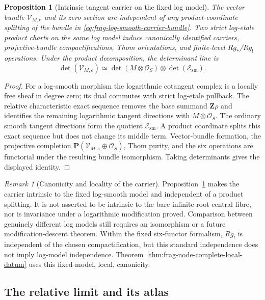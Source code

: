 \documentclass[11pt]{article}
\newtheorem{proposition}[theorem]{Proposition}
\theoremstyle{definition}
\theoremstyle{remark}
\newtheorem{remark}[theorem]{Remark}
\begin{document}
\begin{proposition}[Intrinsic tangent carrier on the fixed log model]
\label{prop:frag-intrinsic-tangent-carrier}
The vector bundle $\mathcal V_{M,e}$ and its zero section are independent of
any product-coordinate splitting of the bundle in
\eqref{eq:frag-log-smooth-carrier-bundle}.  Two strict log-etale product charts
on the same log model induce canonically identified carriers, projective-bundle
compactifications, Thom orientations, and finite-level $Rg_*$/$Rg_!$
operations.  Under the product decomposition, the determinant line is
\[
 \det(\mathcal V_{M,e})
 \simeq \det(M\otimes\mathcal O_S)\otimes\det(\mathcal E_{\mathrm{sm}}).
\]
\end{proposition}

\begin{proof}
For a log-smooth morphism the logarithmic cotangent complex is a locally free
sheaf in degree zero; its dual commutes with strict log-etale pullback.  The
relative characteristic exact sequence removes the base summand
$\mathbf Z\rho$ and identifies the remaining logarithmic tangent directions
with $M\otimes\mathcal O_S$.  The ordinary smooth tangent directions form the
quotient $\mathcal E_{\mathrm{sm}}$.  A product coordinate splits this exact
sequence but does not change its middle term.  Vector-bundle formation, the
projective completion $\mathbf P(\mathcal V_{M,e}\oplus\mathcal O_S)$, Thom
purity, and the six operations are functorial under the resulting bundle
isomorphism.  Taking determinants gives the displayed identity.
\end{proof}

\begin{remark}[Canonicity and locality of the carrier]
\label{rem:frag-carrier-locality}
Proposition~\ref{prop:frag-intrinsic-tangent-carrier} makes the carrier
intrinsic to the fixed log-smooth model and independent of a product
splitting.  It is not asserted to be intrinsic to the bare infinite-root
central fibre, nor is invariance under a logarithmic modification proved.
Comparison between genuinely different log models still requires an
isomorphism or a future modification-descent theorem.  Within the fixed
six-functor formalism, $Rg_!$ is independent of the chosen compactification,
but this standard independence does not imply log-model independence.
Theorem~\ref{thm:frag-node-complete-local-datum} uses this fixed-model, local,
canonicity.
\end{remark}

\subsection{The relative limit and its atlas}
\end{document}
